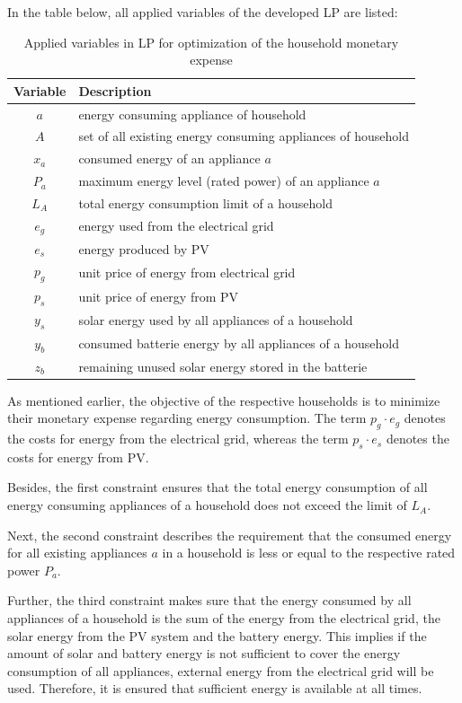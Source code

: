 \clearpage
In the table below, all applied variables of the developed LP are listed:

\begin{longtable}{c|l}
	\caption{Applied variables in LP for optimization of the household monetary expense} 
	\label{table:applied_variables_lp} 
	\\
	\textbf{Variable} & \textbf{Description} \\
	\hline
    $a$ & energy consuming appliance of household \\
	$A$ & set of all existing energy consuming appliances of household \\
	$x_{a}$ & consumed energy of an appliance $a$ \\
	$P_{a}$ & maximum energy level (rated power) of an appliance $a$ \\
	$L_{A}$ & total energy consumption limit of a household \\
	$e_{g}$ & energy used from the electrical grid \\
	$e_{s}$ & energy produced by PV \\
	$p_{g}$ & unit price of energy from electrical grid \\
	$p_{s}$ & unit price of energy from PV \\
	$y_{s}$ & solar energy used by all appliances of a household \\
	$y_{b}$ & consumed batterie energy by all appliances of a household \\
	$z_{b}$ & remaining unused solar energy stored in the batterie \\
\end{longtable} 

As mentioned earlier,
the objective of the respective households is to minimize
their monetary expense regarding energy consumption.
The term $p_{g} \cdot e_{g}$ denotes the costs for energy from the electrical
grid, whereas the term $p_{s} \cdot e_{s}$ denotes the costs for energy from PV. 

Besides, the first constraint ensures that the total energy consumption of all energy consuming
appliances of a household does not exceed the limit of $L_{A}$. 

Next, the second constraint describes the requirement that the consumed energy
for all existing appliances $a$ in a household is less or equal 
to the respective rated power $P_{a}$.

Further, the third constraint makes sure that the energy consumed by all appliances
of a household is the sum of the energy from the electrical grid, the solar energy from the PV system and the battery energy. This implies if the amount of solar and battery energy is not sufficient to cover the energy consumption of all appliances, external energy from the electrical grid will be used. Therefore, it is ensured that sufficient energy is available at all times.

